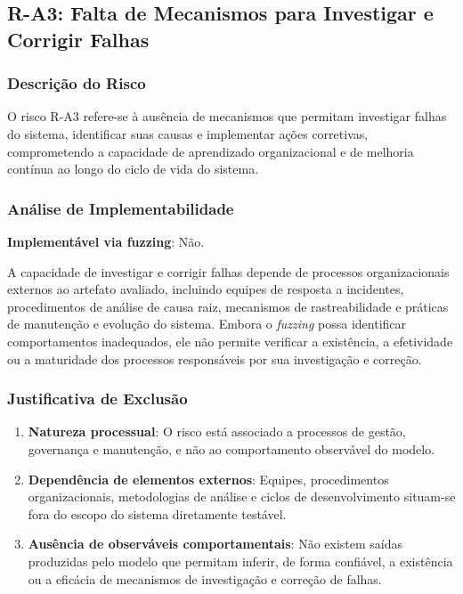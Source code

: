 \subsection{R-A3: Falta de Mecanismos para Investigar e Corrigir Falhas}

\subsubsection{Descrição do Risco}

O risco R-A3 refere-se à ausência de mecanismos que permitam investigar falhas do sistema, identificar suas causas e implementar ações corretivas, comprometendo a capacidade de aprendizado organizacional e de melhoria contínua ao longo do ciclo de vida do sistema.

\subsubsection{Análise de Implementabilidade}

\textbf{Implementável via fuzzing}: Não.

A capacidade de investigar e corrigir falhas depende de processos organizacionais externos ao artefato avaliado, incluindo equipes de resposta a incidentes, procedimentos de análise de causa raiz, mecanismos de rastreabilidade e práticas de manutenção e evolução do sistema. Embora o \textit{fuzzing} possa identificar comportamentos inadequados, ele não permite verificar a existência, a efetividade ou a maturidade dos processos responsáveis por sua investigação e correção.

\subsubsection{Justificativa de Exclusão}

\begin{enumerate}
    \item \textbf{Natureza processual}: O risco está associado a processos de gestão, governança e manutenção, e não ao comportamento observável do modelo.

    \item \textbf{Dependência de elementos externos}: Equipes, procedimentos organizacionais, metodologias de análise e ciclos de desenvolvimento situam-se fora do escopo do sistema diretamente testável.

    \item \textbf{Ausência de observáveis comportamentais}: Não existem saídas produzidas pelo modelo que permitam inferir, de forma confiável, a existência ou a eficácia de mecanismos de investigação e correção de falhas.
\end{enumerate}

